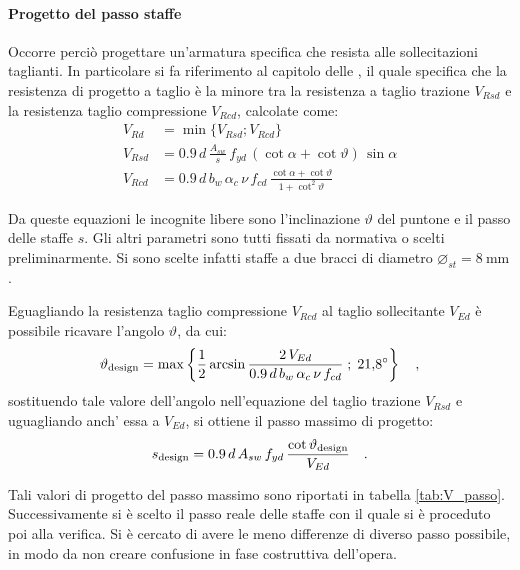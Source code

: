 \paragraph{Progetto del passo staffe}
Occorre perciò progettare un'armatura specifica che resista alle sollecitazioni taglianti.
In particolare si fa riferimento al capitolo  delle , il quale specifica che la resistenza di progetto a taglio è la minore tra la resistenza a taglio trazione $V_{Rsd}$ e la resistenza taglio compressione $V_{Rcd}$, calcolate come:
\begin{align}
    V_{Rd} &= \min \{V_{Rsd} ;  V_{Rcd} \} \label{eq:vrd}\\
    V_{Rsd} &= 0.9\,d\,\frac{A_{sw}}{s}\,f_{yd}\,(\cot\alpha + \cot\vartheta) \, \sin\alpha \\
    V_{Rcd} &= 0.9\,d\,b_w\,\alpha_c\,\nu\,f_{cd}\,\frac{\cot\alpha + \cot\vartheta}{1 + \cot^2\vartheta} 
\end{align}

Da queste equazioni le incognite libere sono l'inclinazione $\vartheta$ del puntone e il passo delle staffe $s$. 
Gli altri parametri sono tutti fissati da normativa o scelti preliminarmente.
Si sono scelte infatti staffe a due bracci di diametro $\varnothing_{st} = \SI{8}{\milli\metre}$.

Eguagliando la resistenza taglio compressione $V_{Rcd}$ al taglio sollecitante $V_{Ed}$ è possibile ricavare l'angolo $\vartheta$, da cui:
\begin{equation}
    \vartheta_\textup{design} = \max \left\{\frac{1}{2} \arcsin \frac{2\,V_{Ed}}{0.9\,d\,b_w\,\alpha_c\,\nu\,f_{cd}}  \; ; \; \SI{21.8}{\degree}\right\} \quad ,
\end{equation}
sostituendo tale valore dell'angolo nell'equazione del taglio trazione $V_{Rsd}$ e uguagliando anch' essa a $V_{Ed}$, si ottiene il passo massimo di progetto:
\begin{equation}
    s_\textup{design} = 0.9\,d\,A_{sw}\,f_{yd}\, \frac{\cot \vartheta_\textup{design}}{V_{Ed}} \quad .
\end{equation}

Tali valori di progetto del passo massimo sono riportati in tabella \ref{tab:V_passo}. 
Successivamente si è scelto il passo reale delle staffe con il quale si è proceduto poi alla verifica.
Si è cercato di avere le meno differenze di diverso passo possibile, in modo da non creare confusione in fase costruttiva dell'opera.


